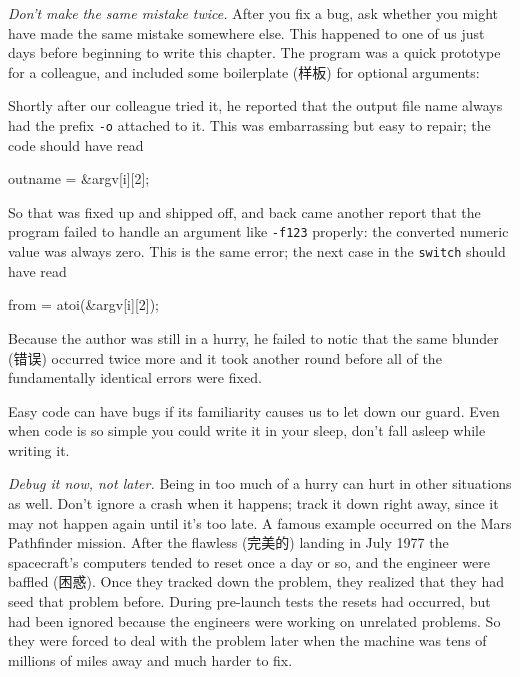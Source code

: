 \emph{Don't make the same mistake twice.} After you fix a bug, ask whether
you might have made the same mistake somewhere else. This happened to one
of us just days before beginning to write this chapter. The program was a
quick prototype for a colleague, and included some boilerplate (样板) for
optional arguments:
\begin{badcode}
    for (i = 1; i < argc; i++) {
        if (argv[i][0] != '-')  /* options finished */
            break;
        switch (argv[i][1]) {
        case 'o':           /* output filename */
            outname = argv[i];
            break;
        case 'f':
            from = atoi(argv[i]);
            break;
        case 't':
            to = atoi(argv[i]);
            break;
        ...
\end{badcode}
Shortly after our colleague tried it, he reported that the output file name
always had the prefix \verb'-o' attached to it. This was embarrassing but
easy to repair; the code should have read 
\begin{wellcode}
    outname = &argv[i][2];
\end{wellcode}
So that was fixed up and shipped off, and back came another report that the
program failed to handle an argument like \verb'-f123' properly: the
converted numeric value was always zero. This is the same error; the next
case in the \verb'switch' should have read
\begin{wellcode}
    from = atoi(&argv[i][2]);
\end{wellcode}
Because the author was still in a hurry, he failed to notic that the same
blunder (错误) occurred twice more and it took another round before all of
the fundamentally identical errors were fixed.

Easy code can have bugs if its familiarity causes us to let down our guard.
Even when code is so simple you could write it in your sleep, don't fall
asleep while writing it.

\emph{Debug it now, not later.} Being in too much of a hurry can hurt in
other situations as well. Don't ignore a crash when it happens; track it
down right away, since it may not happen again until it's too late. A
famous example occurred on the Mars Pathfinder mission. After the flawless
(完美的) landing in July 1977 the spacecraft's computers tended to reset
once a day or so, and the engineer were baffled (困惑). Once they tracked
down the problem, they realized that they had seed that problem before.
During pre-launch tests the resets had occurred, but had been ignored
because the engineers were working on unrelated problems. So they were
forced to deal with the problem later when the machine was tens of millions
of miles away and much harder to fix.

